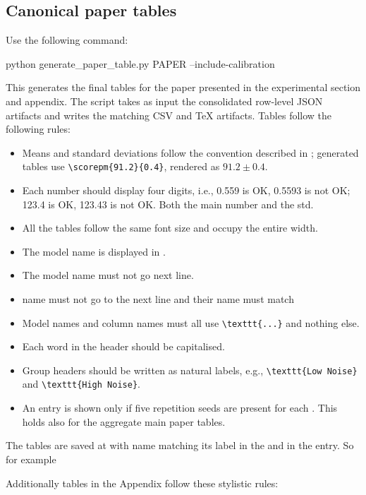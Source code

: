 \documentclass[11pt]{article}
\begin{document}
\subsection{Canonical paper tables}
Use the following command:
\begin{DocCode}
python generate_paper_table.py PAPER --include-calibration
\end{DocCode}
This generates the final tables for the paper presented in the experimental section and appendix.
The script takes as input the consolidated row-level JSON artifacts and writes the matching CSV and TeX artifacts.
Tables follow the following rules:
\begin{itemize}
\item Means and standard deviations follow the convention described in ; generated tables use \verb|\scorepm{91.2}{0.4}|, rendered as \(91.2 \pm {\scriptstyle 0.4}\).
\item Each number should display four digits, i.e., 0.559 is OK, 0.5593 is not OK; 123.4 is OK, 123.43 is not OK. 
Both the main number and the std.
\item All the tables follow the same font size and occupy the entire width.
\item The model name is displayed in .
\item The model name must not go next line.
\item \termSimulator name must not go to the next line and their name must match 
\item Model names and column names must all use \verb|\texttt{...}| and nothing else.
\item Each word in the header should be capitalised.
\item Group headers should be written as natural labels, e.g., \verb|\texttt{Low Noise}| and \verb|\texttt{High Noise}|.
\item An entry is shown only if five repetition seeds are present for each \termSimulator.
This holds also for the aggregate main paper tables.
\end{itemize}
The tables are saved at  with name matching its label in the  and in the  entry.
So for example
\begin{DocCode}
\label{tab:acc_main_experiment_table}

\end{DocCode}
Additionally tables in the Appendix follow these stylistic rules:
\end{document}

